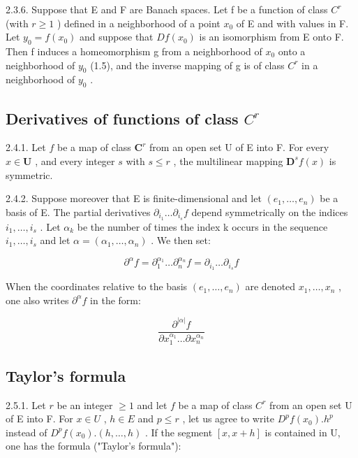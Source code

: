 2.3.6. Suppose that E and F are Banach spaces. Let f be a function of class \(C^{r}\) (with \(r \geqslant 1\) ) defined in a neighborhood of a point \(x_{0}\) of E and with values in F. Let \(y_{0} = f(x_{0})\) and suppose that \(Df(x_{0})\) is an isomorphism from E onto F. Then f induces a homeomorphism g from a neighborhood of \(x_{0}\) onto a neighborhood of \(y_{0}\) (1.5), and the inverse mapping of g is of class \(C^{r}\) in a neighborhood of \(y_{0}\) .

\subsection{\texorpdfstring{Derivatives of functions of class \(C^{r}\)}{Derivatives of functions of class C\^{}\{r\}}}

2.4.1. Let \(f\) be a map of class \(\mathbf{C}^{r}\) from an open set U of E into F. For every \(x \in \mathbf{U}\) , and every integer \(s\) with \(s \leqslant r\) , the multilinear mapping \(\mathbf{D}^{s}f(x)\) is symmetric.

2.4.2. Suppose moreover that E is finite-dimensional and let \((e_{1},\ldots,e_{n})\) be a basis of E. The partial derivatives \(\partial_{i_{1}}\ldots\partial_{i_{s}}f\) depend symmetrically on the indices \(i_{1},\ldots,i_{s}\) . Let \(\alpha_{k}\) be the number of times the index k occurs in the sequence \(i_{1},\ldots,i_{s}\) and let \(\alpha=(\alpha_{1},\ldots,\alpha_{n})\) . We then set:

\[
\partial^ {\alpha} f = \partial_ {1} ^ {\alpha_ {1}} \dots \partial_ {n} ^ {\alpha_ {n}} f = \partial_ {i _ {1}} \dots \partial_ {i _ {s}} f
\]

When the coordinates relative to the basis \((e_{1},\ldots,e_{n})\) are denoted \(x_{1},\ldots,x_{n}\) , one also writes \(\partial^{\alpha}f\) in the form:

\[
\frac {\partial^ {| \alpha |} f}{\partial x _ {1} ^ {\alpha_ {1}} \dots \partial x _ {n} ^ {\alpha_ {n}}}
\]

\subsection{Taylor's formula}

2.5.1. Let \(r\) be an integer \(\geqslant 1\) and let \(f\) be a map of class \(C^r\) from an open set U of E into F. For \(x \in U\) , \(h \in E\) and \(p \leqslant r\) , let us agree to write \(D^{p}f(x_0).h^p\) instead of \(D^{p}f(x_0).(h,\ldots,h)\) . If the segment \([x,x + h]\) is contained in U, one has the formula ("Taylor's formula"):

